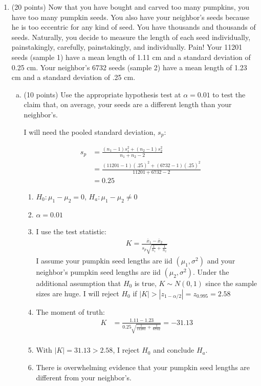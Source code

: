 \documentclass{article}\usepackage{graphicx, color}
\providecommand{\ov}[1]{\overline{#1}}
\numberwithin{equation}{section}
\begin{document}
\begin{flushleft}
\begin{enumerate}[1. ]
\item (20 points) Now that you have bought and carved too many pumpkins, you have too many pumpkin seeds. You also have your neighbor's seeds because he is too eccentric for any kind of seed. You have thousands and thousands of seeds. Naturally, you decide to measure the length of each seed individually, painstakingly, carefully, painstakingly, and individually. Pain! Your 11201 seeds (sample 1) have a mean length of 1.11 cm and a standard deviation of 0.25 cm. Your neighbor's 6732 seeds (sample 2) have a mean length of 1.23 cm and a standard deviation of .25 cm. 

\begin{enumerate}[a. ]
\item (10 points) Use the appropriate hypothesis test at $\alpha = 0.01$ to test the claim that, on average, your seeds are a different length than your neighbor's.

{\color{red}

I will need the pooled standard deviation, $s_p$:

\begin{align*}
s_p &= \frac{(n_1 - 1)s_1^2 + (n_2 - 1) s_2^2}{n_1 + n_2 - 2} \\
&=\frac{(11201- 1)(.25)^2 + (6732 - 1) (.25)^2}{11201 + 6732 - 2} \\
&= 0.25 
\end{align*}


\begin{enumerate}[1. ]
\item $H_0: \mu_1 - \mu_2 = 0$, $H_a: \mu_1 - \mu_2 \ne 0$
\item $\alpha = 0.01$
\item I use the test statistic:
\begin{align*}
K = \frac{\ov{x}_1 - \ov{x}_2}{s_p\sqrt{\frac{1}{n_1} + \frac{1}{n_2}}}
\end{align*}
I assume your pumpkin seed lengths are iid $(\mu_1, \sigma^2)$ and your neighbor's pumpkin seed lengths are iid $(\mu_2, \sigma^2)$. Under the additional assumption that $H_0$ is true, $K \sim N(0,1)$ since the sample sizes are huge. I will reject $H_0$ if $|K| > |z_{1 - \alpha/2}| = z_{ 0.995} = 2.58$
\item The moment of truth:
\begin{align*}
K &=\frac{1.11 - 1.23}{0.25\sqrt{\frac{1}{11201} + \frac{1}{6732}}}  = -31.13 \\
\end{align*} 
\item With $|K| = 31.13 > 2.58$, I reject $H_0$ and conclude $H_a$. 
\item There is overwhelming evidence that your pumpkin seed lengths are different from your neighbor's.
\end{enumerate}



}
\end{enumerate}
\end{enumerate}
\end{flushleft}
\end{document}
